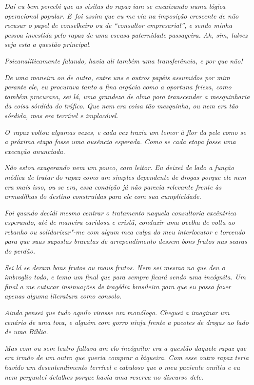 \emph{Daí eu bem percebi que as visitas do rapaz iam se encaixando numa
lógica operacional popular. E~foi assim que eu me via na imposição
crescente de não recusar o papel de conselheiro ou de ``consultor
empresarial'', e sendo minha pessoa investida pelo rapaz de uma escusa
paternidade passageira. Ah, sim, talvez seja esta a questão principal.}~

\emph{Psicanaliticamente falando, havia ali também uma transferência, e
por que não!}

\emph{De uma maneira ou de outra, entre uns e outros papéis assumidos
por mim perante ele, eu procurava tanto a fina argúcia como a oportuna
frieza, como também procurava, sei lá, uma grandeza de alma para
transcender a mesquinharia da coisa sórdida do tráfico. Que nem era
coisa tão mesquinha, ou nem era tão sórdida, mas era terrível e
implacável.}~

\emph{O~rapaz voltou algumas vezes, e cada vez trazia um temor à flor da
pele como se a próxima etapa fosse uma ausência esperada. Como se cada
etapa fosse uma execução anunciada.}~

\emph{Não estou exagerando nem um pouco, caro leitor. Eu deixei de lado
a função médica de tratar do rapaz como um simples dependente de drogas
porque ele nem era mais isso, ou se era, essa condição já não parecia
relevante frente às armadilhas do destino construídas para ele com sua
cumplicidade.}~

\emph{Foi quando decidi mesmo centrar o tratamento naquela consultoria
excêntrica esperando, até de maneira caridosa e cristã, conduzir uma
ovelha de volta ao rebanho ou solidarizar"-me com algum mea culpa do meu
interlocutor e torcendo para que suas supostas bravatas de
arrependimento dessem bons frutos nas searas do perdão.}

\emph{Sei lá se deram bons frutos ou maus frutos. Nem sei mesmo no que
deu o imbroglio todo, e temo um final que para sempre ficará sendo uma
incógnita. Um final a me cutucar insinuações de tragédia brasileira para
que eu possa fazer apenas alguma literatura como consolo.}~

\emph{Ainda pensei que tudo aquilo virasse um monólogo. Cheguei a
imaginar um cenário de uma toca, e alguém com gorro ninja frente a
pacotes de drogas ao lado de uma Bíblia.}~

\emph{Mas com ou sem teatro faltava um elo incógnito: era a questão
daquele rapaz que era irmão de um outro que queria comprar a biqueira.
Com esse outro rapaz teria havido um desentendimento terrível e cabuloso
que o meu paciente omitiu e eu nem perguntei detalhes porque havia uma
reserva no discurso dele.}~

